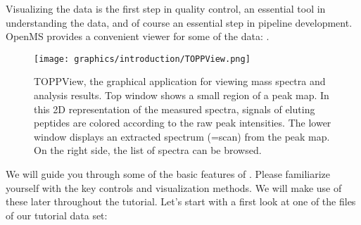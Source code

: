 Visualizing the data is the first step in quality control, an essential tool in understanding the data, and of course an essential step in pipeline development.
OpenMS provides a convenient viewer for some of the data: .

\begin{figure}
\texttt{[image: graphics/introduction/TOPPView.png]}
\caption{TOPPView, the graphical application for viewing mass spectra and analysis results. Top window shows a small region of a peak map. In this 2D representation of the measured spectra, signals of eluting peptides are colored according to the raw peak intensities. The lower window displays an extracted spectrum (=scan) from the peak map. On the right side, the list of spectra can be browsed.}
\label{fig:toppview}
\end{figure}

We will guide you through some of the basic features of . Please familiarize yourself with the key controls and visualization methods.
We will make use of these later throughout the tutorial. Let's start with a first look at one of the files of our tutorial data set:


